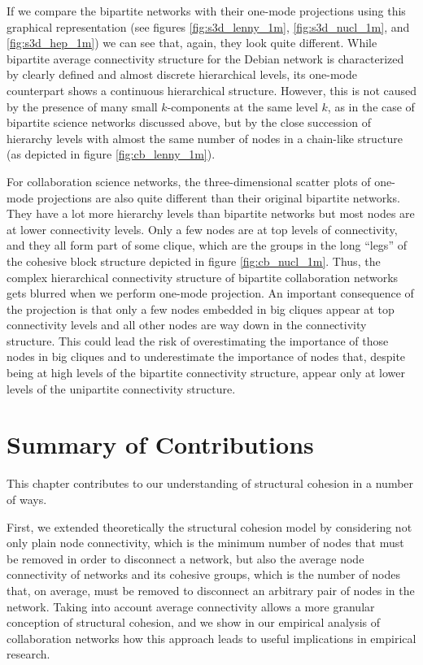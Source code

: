 If we compare the bipartite networks with their one-mode projections using this graphical representation (see figures \ref{fig:s3d_lenny_1m}, \ref{fig:s3d_nucl_1m}, and \ref{fig:s3d_hep_1m}) we can see that, again, they look quite different. While bipartite average connectivity structure for the Debian network is characterized by clearly defined and almost discrete hierarchical levels, its one-mode counterpart shows a continuous hierarchical structure. However, this is not caused by the presence of many small $k$-components at the same level $k$, as in the case of bipartite science networks discussed above, but by the close succession of hierarchy levels with almost the same number of nodes in a chain-like structure (as depicted in figure \ref{fig:cb_lenny_1m}).

For collaboration science networks, the three-dimensional scatter plots of one-mode projections are also quite different than their original bipartite networks. They have a lot more hierarchy levels than bipartite networks but most nodes are at lower connectivity levels. Only a few nodes are at top levels of connectivity, and they all form part of some clique, which are the groups in the long ``legs'' of the cohesive block structure depicted in figure \ref{fig:cb_nucl_1m}. Thus, the complex hierarchical connectivity structure of bipartite collaboration networks gets blurred when we perform one-mode projection. An important consequence of the projection is that only a few nodes embedded in big cliques appear at top connectivity levels and all other nodes are way down in the connectivity structure. This could lead the risk of overestimating the importance of those nodes in big cliques and to underestimate the importance of nodes that, despite being at high levels of the bipartite connectivity structure, appear only at lower levels of the unipartite connectivity structure.

\section{Summary of Contributions}

This chapter contributes to our understanding of structural cohesion in a number of ways.

First, we extended theoretically the structural cohesion model by considering not only plain node connectivity, which is the minimum number of nodes that must be removed in order to disconnect a network, but also the average node connectivity of networks and its cohesive groups, which is the number of nodes that, on average, must be removed to disconnect an arbitrary pair of nodes in the network. Taking into account average connectivity allows a more granular conception of structural cohesion, and we show in our empirical analysis of collaboration networks how this approach leads to useful implications in empirical research.

